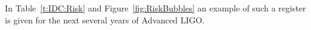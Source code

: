 In Table~\ref{t:IDC:Risk} and Figure~\ref{fig:RiskBubbles} an example of such
a register is given for the next several years of Advanced LIGO.

